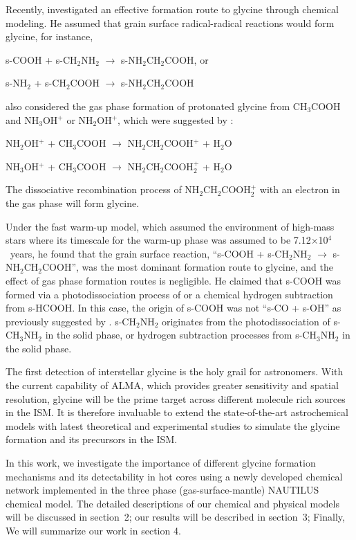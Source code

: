 \documentclass{aastex61}
\begin{document}
Recently, \cite{Garrod13} investigated an effective formation route to glycine through chemical modeling.
%
He assumed that grain surface radical-radical reactions would form glycine, for instance,

s-COOH + s-CH$_2$NH$_2$ $\longrightarrow$ s-NH$_2$CH$_2$COOH, or

s-NH$_2$ + s-CH$_2$COOH $\longrightarrow$ s-NH$_2$CH$_2$COOH

\cite{Garrod13} also considered the gas phase formation of protonated glycine from CH$_3$COOH and NH$_3$OH$^+$ or NH$_2$OH$^+$, which were suggested by \cite{Blagojevic03}:

NH$_2$OH$^+$ + CH$_3$COOH $\longrightarrow$ NH$_2$CH$_2$COOH$^+$ + H$_2$O

NH$_3$OH$^+$ + CH$_3$COOH $\longrightarrow$ NH$_2$CH$_2$COOH$_2^+$ + H$_2$O

The dissociative recombination process of NH$_2$CH$_2$COOH$_2^+$ with an electron in the gas phase will form glycine.

Under the fast warm-up model, which assumed the environment of high-mass stars where its timescale for the warm-up phase was assumed to be 7.12$\times$10$^4$~years, he found that the grain surface reaction, ``s-COOH + s-CH$_2$NH$_2$ $\longrightarrow$ s-NH$_2$CH$_2$COOH'', was the most dominant formation route to glycine, and the effect of gas phase formation routes is negligible.
%
He claimed that s-COOH was formed via a photodissociation process of or a chemical hydrogen subtraction from s-HCOOH.
%
In this case, the origin of s-COOH was not ``s-CO + s-OH'' as previously suggested by \cite{Woon02}.
%
s-CH$_2$NH$_2$ originates from the photodissociation of s-CH$_3$NH$_2$ in the solid phase, or hydrogen subtraction processes from s-CH$_3$NH$_2$ in the solid phase.
%

The first detection of interstellar glycine is the holy grail for astronomers. With the current capability of ALMA, which provides greater sensitivity and spatial resolution, glycine will be the prime target across different molecule rich sources in the ISM. It is therefore invaluable to extend the state-of-the-art astrochemical models with latest theoretical and experimental studies to simulate the glycine formation and its precursors in the ISM.
%

In this work, we investigate the importance of different glycine formation mechanisms and its detectability in hot cores using a newly developed chemical network implemented in the three phase (gas-surface-mantle) NAUTILUS chemical model.
%
The detailed descriptions of our chemical and physical models will be discussed in section~2; our results will be described in section~3;
%
Finally, We will summarize our work in section 4.
\end{document}
